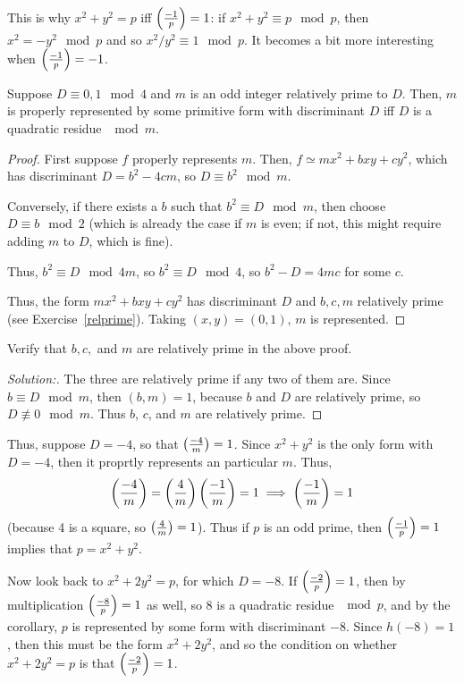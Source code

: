 This is why $x^2+y^2 = p$ iff $\left(\frac{-1}{p}\right) = 1$: if $x^2 + y^2\equiv p\mod p$, then $x^2 = -y^2\mod p$ and so $x^2/y^2 \equiv 1\mod p$. It becomes a bit more interesting when $\left(\frac{-1}{p}\right) = -1$.
\begin{cor}
Suppose $D \equiv 0,1\mod 4$ and $m$ is an odd integer relatively prime to $D$. Then, $m$ is properly represented by some primitive form with discriminant $D$ iff $D$ is a quadratic residue $\mod m$.
\end{cor}
\begin{proof}
First suppose $f$ properly represents $m$. Then, $f\simeq mx^2+bxy+cy^2$, which has discriminant $D = b^2-4cm$, so $D\equiv b^2\mod m$.

Conversely, if there exists a $b$ such that $b^2\equiv D\mod m$, then choose $D \equiv b\mod 2$ (which is already the case if $m$ is even; if not, this might require adding $m$ to $D$, which is fine).

Thus, $b^2 \equiv D\mod 4m$, so $b^2\equiv D\mod 4$, so $b^2 - D = 4mc$ for some $c$.

Thus, the form $mx^2+bxy+cy^2$ has discriminant $D$ and $b,c,m$ relatively prime (see Exercise~\ref{relprime}). Taking $(x,y) = (0,1)$, $m$ is represented.
\end{proof}
\begin{ex}
\label{relprime}
Verify that $b,c,$ and $m$ are relatively prime in the above proof.
\end{ex}
\begin{proof}[Solution:] The three are relatively prime if any two of them are. Since $b\equiv D\mod m$, then $(b,m) = 1$, because $b$ and $D$ are relatively prime, so $D\not\equiv 0\mod m$. Thus $b$, $c$, and $m$ are relatively prime.
\end{proof}
Thus, suppose $D = -4$, so that $\left(\frac{-4}{m}\right) = 1$. Since $x^2+y^2$ is the only form with $D = -4$, then it proprtly represents an particular $m$. Thus,
\[\left(\frac{-4}{m}\right) = \left(\frac{4}{m}\right)\left(\frac{-1}{m}\right) = 1 \implies \left(\frac{-1}{m}\right) = 1\] (because 4 is a square, so $\left(\frac{4}{m}\right) = 1$). Thus if $p$ is an odd prime, then $\left(\frac{-1}{p}\right) = 1$ implies that $p = x^2+y^2$.

Now look back to $x^2+2y^2 = p$, for which $D = -8$. If $\left(\frac{-2}{p}\right) = 1$, then by multiplication $\left(\frac{-8}{p}\right) = 1$ as well, so 8 is a quadratic residue $\mod p$, and by the corollary, $p$ is represented by some form with discriminant $-8$. Since $h(-8) = 1$, then this must be the form $x^2+2y^2$, and so the condition on whether $x^2+2y^2 = p$ is that $\left(\frac{-2}{p}\right) = 1$.

